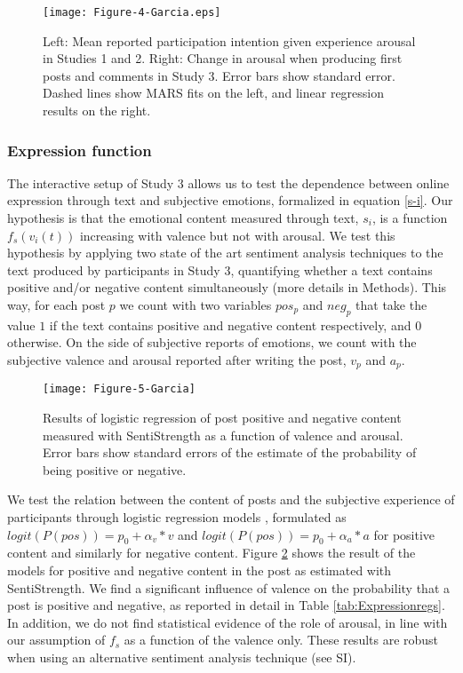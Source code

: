 \documentclass[nologo,url,11pt,a4paper]{ETHpaper}
\begin{document}
\begin{figure}[h]
\centering
\texttt{[image: Figure-4-Garcia.eps]}
\caption{Left: Mean reported
  participation intention given experience arousal in Studies 1 and 2. Right:
  Change in arousal when producing first posts and comments in Study 3. Error bars show standard
  error. Dashed lines show MARS fits on the left, and linear regression results on the right.
  \label{fig:Participate} }
\end{figure}


\subsubsection{Expression function} 

The interactive setup of Study 3 allows us to test the dependence between
online expression through text and subjective emotions, formalized in equation
\ref{s-i}. Our hypothesis is that the emotional content measured through
text, $s_i$, is a function $f_s(v_i(t))$ increasing with valence but not with
arousal. We test this hypothesis by applying two state of the art sentiment
analysis techniques to the text produced by participants in Study 3,
quantifying whether a text contains positive and/or negative content
simultaneously (more details in Methods). This way, for each post $p$ we count
with two variables $pos_p$ and $neg_p$ that take the value $1$ if the text
contains positive and negative content respectively, and $0$ otherwise. On the
side of subjective reports of emotions, we count with the subjective valence
and arousal reported after writing the post, $v_p$ and $a_p$.

\begin{figure}[ht]
\centering
\texttt{[image: Figure-5-Garcia]}
\caption{Results of logistic regression of post positive and negative content measured with
SentiStrength as a function of valence and arousal. Error bars show standard errors of the estimate of
the probability of being positive or negative.\label{fig:Expression} } \end{figure}


We test the relation between the content of posts and the subjective
experience of participants through logistic regression models
\cite{Crawley2014}, formulated as $logit(P(pos))=p_0+\alpha_v*v$ and
$logit(P(pos))=p_0+\alpha_a*a$ for positive content and similarly for negative
content. Figure \ref{fig:Expression} shows the result of the models for
positive and negative content in the post as estimated with SentiStrength. We
find a significant influence of valence on the probability that a post is
positive and negative, as reported in detail in Table
\ref{tab:Expressionregs}. In addition, we do not find statistical evidence of
the role of arousal, in line with our assumption of $f_s$ as a function of the
valence only. These results are robust when using an alternative sentiment
analysis technique (see SI).
\end{document}

